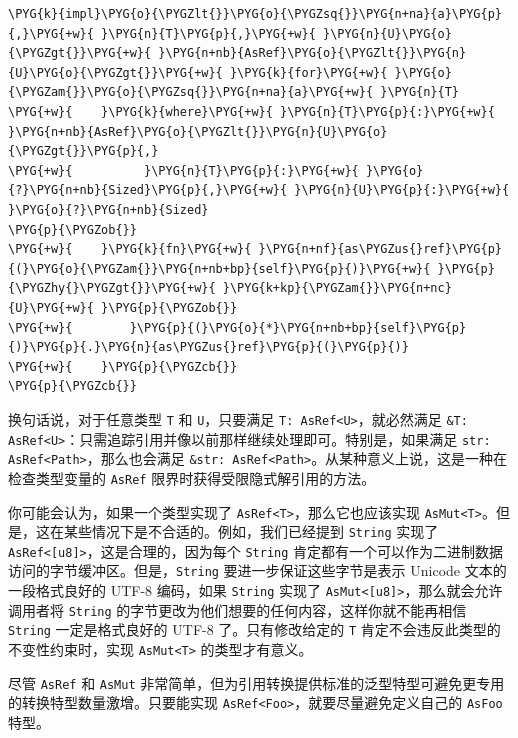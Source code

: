 \begin{Verbatim}[commandchars=\\\{\},breaklines=true,breakanywhere=true,fontsize=\codefont,xleftmargin=17bp]
\PYG{k}{impl}\PYG{o}{\PYGZlt{}}\PYG{o}{\PYGZsq{}}\PYG{n+na}{a}\PYG{p}{,}\PYG{+w}{ }\PYG{n}{T}\PYG{p}{,}\PYG{+w}{ }\PYG{n}{U}\PYG{o}{\PYGZgt{}}\PYG{+w}{ }\PYG{n+nb}{AsRef}\PYG{o}{\PYGZlt{}}\PYG{n}{U}\PYG{o}{\PYGZgt{}}\PYG{+w}{ }\PYG{k}{for}\PYG{+w}{ }\PYG{o}{\PYGZam{}}\PYG{o}{\PYGZsq{}}\PYG{n+na}{a}\PYG{+w}{ }\PYG{n}{T}
\PYG{+w}{    }\PYG{k}{where}\PYG{+w}{ }\PYG{n}{T}\PYG{p}{:}\PYG{+w}{ }\PYG{n+nb}{AsRef}\PYG{o}{\PYGZlt{}}\PYG{n}{U}\PYG{o}{\PYGZgt{}}\PYG{p}{,}
\PYG{+w}{          }\PYG{n}{T}\PYG{p}{:}\PYG{+w}{ }\PYG{o}{?}\PYG{n+nb}{Sized}\PYG{p}{,}\PYG{+w}{ }\PYG{n}{U}\PYG{p}{:}\PYG{+w}{ }\PYG{o}{?}\PYG{n+nb}{Sized}
\PYG{p}{\PYGZob{}}
\PYG{+w}{    }\PYG{k}{fn}\PYG{+w}{ }\PYG{n+nf}{as\PYGZus{}ref}\PYG{p}{(}\PYG{o}{\PYGZam{}}\PYG{n+nb+bp}{self}\PYG{p}{)}\PYG{+w}{ }\PYG{p}{\PYGZhy{}\PYGZgt{}}\PYG{+w}{ }\PYG{k+kp}{\PYGZam{}}\PYG{n+nc}{U}\PYG{+w}{ }\PYG{p}{\PYGZob{}}
\PYG{+w}{        }\PYG{p}{(}\PYG{o}{*}\PYG{n+nb+bp}{self}\PYG{p}{)}\PYG{p}{.}\PYG{n}{as\PYGZus{}ref}\PYG{p}{(}\PYG{p}{)}
\PYG{+w}{    }\PYG{p}{\PYGZcb{}}
\PYG{p}{\PYGZcb{}}
\end{Verbatim}

换句话说，对于任意类型 \texttt{T} 和 \texttt{U}，只要满足 \texttt{T: AsRef<U>}，就必然满足 \texttt{\&T: AsRef<U>}：只需追踪引用并像以前那样继续处理即可。特别是，如果满足 \texttt{str: AsRef<Path>}，那么也会满足 \texttt{\&str: AsRef<Path>}。从某种意义上说，这是一种在检查类型变量的 \texttt{AsRef} 限界时获得受限隐式解引用的方法。

你可能会认为，如果一个类型实现了 \texttt{AsRef<T>}，那么它也应该实现 \texttt{AsMut<T>}。但是，这在某些情况下是不合适的。例如，我们已经提到 \texttt{String} 实现了 \texttt{AsRef<[u8]>}，这是合理的，因为每个 \texttt{String} 肯定都有一个可以作为二进制数据访问的字节缓冲区。但是，\texttt{String} 要进一步保证这些字节是表示 Unicode 文本的一段格式良好的 UTF-8 编码，如果 \texttt{String} 实现了 \texttt{AsMut<[u8]>}，那么就会允许调用者将 \texttt{String} 的字节更改为他们想要的任何内容，这样你就不能再相信 \texttt{String} 一定是格式良好的 UTF-8 了。只有修改给定的 \texttt{T} 肯定不会违反此类型的不变性约束时，实现 \texttt{AsMut<T>} 的类型才有意义。

尽管 \texttt{AsRef} 和 \texttt{AsMut} 非常简单，但为引用转换提供标准的泛型特型可避免更专用的转换特型数量激增。只要能实现 \texttt{AsRef<Foo>}，就要尽量避免定义自己的 \texttt{AsFoo} 特型。

